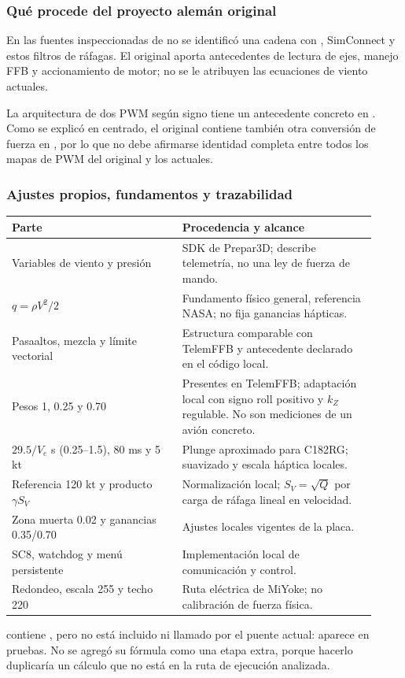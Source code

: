 \subsubsection{Qué procede del proyecto alemán original}
En las fuentes inspeccionadas de  no se identificó una cadena con , SimConnect y estos filtros de ráfagas. El original aporta antecedentes de lectura de ejes, manejo FFB y accionamiento de motor; no se le atribuyen las ecuaciones de viento actuales.

La arquitectura de dos PWM según signo tiene un antecedente concreto en . Como se explicó en centrado, el original contiene también otra conversión de fuerza en , por lo que no debe afirmarse identidad completa entre todos los mapas de PWM del original y los actuales.

\subsubsection{Ajustes propios, fundamentos y trazabilidad}
\begin{longtable}{p{0.43\linewidth}p{0.49\linewidth}}
\toprule Parte & Procedencia y alcance\\\midrule\endhead
Variables de viento y presión & SDK de Prepar3D; describe telemetría, no una ley de fuerza de mando.\\
$q=\rho V^2/2$ & Fundamento físico general, referencia NASA; no fija ganancias hápticas.\\
Pasaaltos, mezcla y límite vectorial & Estructura comparable con TelemFFB y antecedente declarado en el código local.\\
Pesos 1, 0.25 y 0.70 & Presentes en TelemFFB; adaptación local con signo roll positivo y $k_Z$ regulable. No son mediciones de un avión concreto.\\
$29.5/V_e$ s (0.25--1.5), 80 ms y 5 kt & Plunge aproximado para C182RG; suavizado y escala háptica locales.\\
Referencia 120 kt y producto $\gamma S_V$ & Normalización local; $S_V=\sqrt Q$ por carga de ráfaga lineal en velocidad.\\
Zona muerta 0.02 y ganancias 0.35/0.70 & Ajustes locales vigentes de la placa.\\
SC8, watchdog y menú persistente & Implementación local de comunicación y control.\\
Redondeo, escala 255 y techo 220 & Ruta eléctrica de MiYoke; no calibración de fuerza física.\\
\bottomrule
\end{longtable}
 contiene , pero no está incluido ni llamado por el puente actual: aparece en pruebas. No se agregó su fórmula como una etapa extra, porque hacerlo duplicaría un cálculo que no está en la ruta de ejecución analizada.

